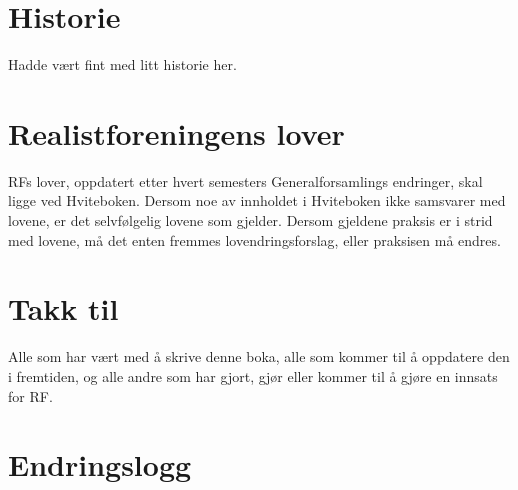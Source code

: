 \documentclass[11pt,norsk,a4paper,pointlessnumbers]{scrbook}
\begin{document}


\chapter{Historie}
Hadde vært fint med litt historie her.

\chapter{Realistforeningens lover}
RFs lover, oppdatert etter hvert semesters Generalforsamlings 
endringer, skal ligge ved Hviteboken. Dersom noe av innholdet
i Hviteboken ikke samsvarer med lovene, er det selvfølgelig
lovene som gjelder. Dersom gjeldene praksis er i strid med
lovene, må det enten fremmes lovendringsforslag, eller praksisen
må endres.


\chapter{Takk til}
Alle som har vært med å skrive denne boka, alle som kommer til å oppdatere den i fremtiden, og alle andre som har gjort, gjør eller kommer til å gjøre en innsats for RF.

\chapter{Endringslogg}

\end{document}
